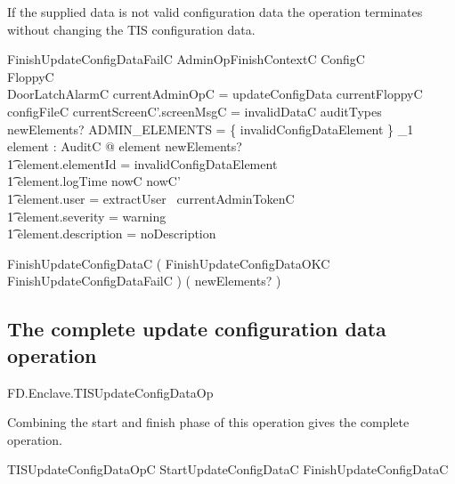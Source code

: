 If the supplied data is not valid configuration data the operation
terminates without changing the TIS configuration data.

\begin{schema}{FinishUpdateConfigDataFailC}
        AdminOpFinishContextC
\also
        \Xi ConfigC
\\      \Xi FloppyC
\\      \Xi DoorLatchAlarmC
\where
        \The currentAdminOpC = updateConfigData
\also        
        currentFloppyC \notin \ran configFileC
\also
        currentScreenC'.screenMsgC = invalidDataC
\also
        auditTypes~ newElements? \cap ADMIN\_ELEMENTS = 
        \{ invalidConfigDataElement \} 
\also
        \exists_1 element : AuditC @ element \in newElements? 
\\ \t1  \land element.elementId = invalidConfigDataElement
\\ \t1  \land element.logTime \in nowC \upto nowC'
\\ \t1  \land element.user = extractUser~ currentAdminTokenC
\\ \t1  \land element.severity = warning
\\ \t1  \land element.description = noDescription
\end{schema}

\begin{zed}
        FinishUpdateConfigDataC  ( FinishUpdateConfigDataOKC \lor
        FinishUpdateConfigDataFailC ) \hide
( newElements? )
\end{zed}

\subsection{The complete update configuration data operation}

\begin{traceunit}{FD.Enclave.TISUpdateConfigDataOp}
\end{traceunit}



Combining the start and finish phase of this operation gives the
complete operation.

\begin{zed}
        TISUpdateConfigDataOpC  StartUpdateConfigDataC \lor FinishUpdateConfigDataC
\end{zed}

